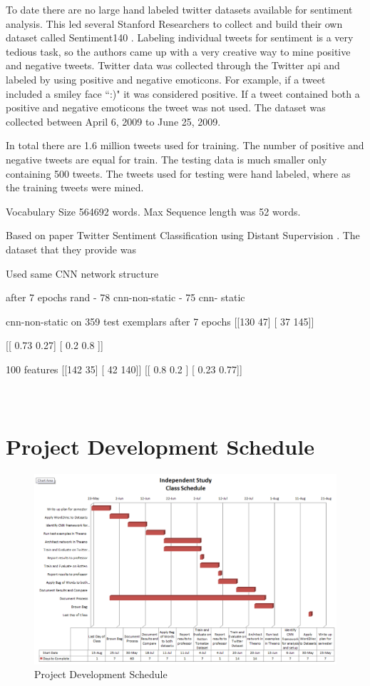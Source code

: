 \documentclass[12pt]{article}
\begin{document}
To date there are no large hand labeled twitter datasets available for sentiment analysis. This led several Stanford Researchers \cite{Go_Bhayani_Huang_2009} to collect and build their own dataset called Sentiment140 \cite{sentiment140}. Labeling individual tweets for sentiment is a very tedious task, so the authors came up with a very creative way to mine positive and negative tweets. Twitter data was collected through the Twitter \ac{api} and labeled by using positive and negative emoticons. For example, if a tweet included a smiley face ``:)" it was considered positive. If a tweet contained both a positive and negative emoticons the tweet was not used. The dataset was collected between April 6, 2009 to June 25, 2009.

In total there are 1.6 million tweets used for training. The number of positive and negative tweets are equal for train. The testing data is much smaller only containing 500 tweets. The tweets used for testing were hand labeled, where as the training tweets were mined.

Vocabulary Size 564692 words.
Max Sequence length was 52 words.

Based on paper Twitter Sentiment Classification using Distant Supervision \cite{Go_Bhayani_Huang_2009}. The dataset that they provide was

Used same CNN network structure \cite{kim2014convolutional}

after 7 epochs
rand - 78 %
cnn-non-static - 75 %
cnn- static

cnn-non-static on 359 test exemplars after 7 epochs
[[130  47]
[ 37 145]]

[[ 0.73  0.27]
[ 0.2   0.8 ]]

100 features
[[142  35]
[ 42 140]]
[[ 0.8   0.2 ]
[ 0.23  0.77]]


\newpage
\appendix
\section{\\Project Development Schedule} \label{App:AppendixA}
\begin{figure}[htbp!]
	\centering
	\includegraphics[scale=.5]{gantt.PNG}
	\caption{Project Development Schedule}
\end{figure}
\end{document}
